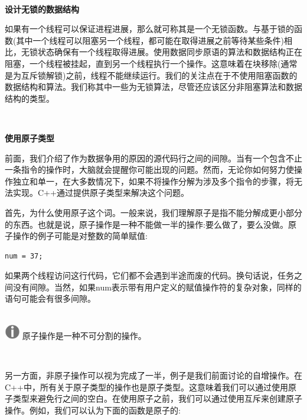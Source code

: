 \noindent\textbf{}\ \par
\textbf{设计无锁的数据结构} \ \par
如果有一个线程可以保证进程进展，那么就可称其是一个无锁函数。与基于锁的函数(其中一个线程可以阻塞另一个线程，都可能在取得进展之前等待某些条件)相比，无锁状态确保有一个线程取得进展。使用数据同步原语的算法和数据结构正在阻塞，一个线程被挂起，直到另一个线程执行一个操作。这意味着在块移除(通常是为互斥锁解锁)之前，线程不能继续运行。我们的关注点在于不使用阻塞函数的数据结构和算法。我们称其中一些为无锁算法，尽管还应该区分非阻塞算法和数据结构的类型。 \par

\noindent\textbf{}\ \par
\textbf{使用原子类型} \ \par
前面，我们介绍了作为数据争用的原因的源代码行之间的间隙。当有一个包含不止一条指令的操作时，大脑就会提醒你可能出现的问题。然而，无论你如何努力使操作独立和单一，在大多数情况下，如果不将操作分解为涉及多个指令的步骤，将无法实现。C++通过提供原子类型来解决这个问题。 \par
首先，为什么使用原子这个词。一般来说，我们理解原子是指不能分解成更小部分的东西。也就是说，原子操作是一种不能做一半的操作:要么做了，要么没做。原子操作的例子可能是对整数的简单赋值: \par

\begin{lstlisting}[caption={}]
num = 37;
\end{lstlisting}

如果两个线程访问这行代码，它们都不会遇到半途而废的代码。换句话说，任务之间没有间隙。当然，如果num表示带有用户定义的赋值操作符的复杂对象，同样的语句可能会有很多间隙。 \par

\hspace*{\fill} \\ %
\includegraphics[width=0.05\textwidth]{images/warn}
原子操作是一种不可分割的操作。 \par
\noindent\textbf{}\ \par

另一方面，非原子操作可以视为完成了一半，例子是我们前面讨论的自增操作。在C++中，所有关于原子类型的操作也是原子类型。这意味着我们可以通过使用原子类型来避免行之间的空白。在使用原子之前，我们可以通过使用互斥来创建原子操作。例如，我们可以认为下面的函数是原子的: \par

